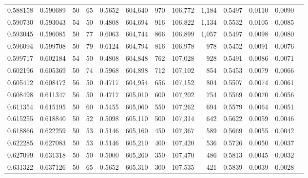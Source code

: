 \begin{tabular}{rrrrrrrrrrrrr}
0.588158 & 0.590689 &    50 &  65 &                                     0.5652 & 604,640 &     970 & 106,772 &   1,184 & 0.5497 & 0.0110 & 0.0090 \\
0.590730 & 0.593043 &    54 &  50 &                                     0.4808 & 604,694 &     916 & 106,822 &   1,134 & 0.5532 & 0.0105 & 0.0085 \\
0.593045 & 0.596085 &    50 &  77 &                                     0.6063 & 604,744 &     866 & 106,899 &   1,057 & 0.5497 & 0.0098 & 0.0080 \\
0.596094 & 0.599708 &    50 &  79 &                                     0.6124 & 604,794 &     816 & 106,978 &     978 & 0.5452 & 0.0091 & 0.0076 \\
0.599717 & 0.602184 &    54 &  50 &                                     0.4808 & 604,848 &     762 & 107,028 &     928 & 0.5491 & 0.0086 & 0.0071 \\
0.602196 & 0.605369 &    50 &  74 &                                     0.5968 & 604,898 &     712 & 107,102 &     854 & 0.5453 & 0.0079 & 0.0066 \\
0.605412 & 0.608472 &    56 &  50 &                                     0.4717 & 604,954 &     656 & 107,152 &     804 & 0.5507 & 0.0074 & 0.0061 \\
0.608498 & 0.611347 &    56 &  50 &                                     0.4717 & 605,010 &     600 & 107,202 &     754 & 0.5569 & 0.0070 & 0.0056 \\
0.611354 & 0.615195 &    50 &  60 &                                     0.5455 & 605,060 &     550 & 107,262 &     694 & 0.5579 & 0.0064 & 0.0051 \\
0.615255 & 0.618840 &    50 &  52 &                                     0.5098 & 605,110 &     500 & 107,314 &     642 & 0.5622 & 0.0059 & 0.0046 \\
0.618866 & 0.622259 &    50 &  53 &                                     0.5146 & 605,160 &     450 & 107,367 &     589 & 0.5669 & 0.0055 & 0.0042 \\
0.622285 & 0.627083 &    50 &  53 &                                     0.5146 & 605,210 &     400 & 107,420 &     536 & 0.5726 & 0.0050 & 0.0037 \\
0.627099 & 0.631318 &    50 &  50 &                                     0.5000 & 605,260 &     350 & 107,470 &     486 & 0.5813 & 0.0045 & 0.0032 \\
0.631322 & 0.637126 &    50 &  65 &                                     0.5652 & 605,310 &     300 & 107,535 &     421 & 0.5839 & 0.0039 & 0.0028 \\

\end{tabular}
